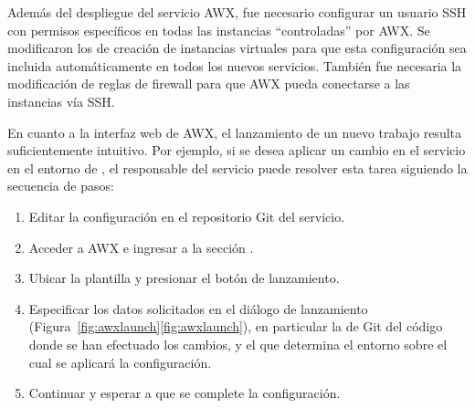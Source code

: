 Además del despliegue del servicio AWX, fue necesario configurar un
usuario SSH con permisos específicos en todas las instancias
``controladas'' por AWX. Se modificaron los  de
creación de instancias virtuales para que esta configuración sea
incluida automáticamente en todos los nuevos servicios. También fue
necesaria la modificación de reglas de firewall para que AWX pueda
conectarse a las instancias vía SSH.

En cuanto a la interfaz web de AWX, el lanzamiento de un nuevo trabajo
resulta suficientemente intuitivo. Por ejemplo, si se desea aplicar un
cambio en el servicio  en el entorno de
, el responsable del servicio puede resolver esta
tarea siguiendo la secuencia de pasos:

\begin{enumerate}
\item Editar la configuración en el repositorio Git del servicio.
\item Acceder a AWX e ingresar a la sección .
\item Ubicar la plantilla  y presionar el botón de
  lanzamiento.
\item Especificar los datos solicitados en el diálogo de lanzamiento
  (\iflatexml{}Figura~\ref{fig:awxlaunch}\else\autoref{fig:awxlaunch}\fi),
  en particular la  de Git del código donde se han efectuado
  los cambios, y el  que determina el entorno sobre el cual
  se aplicará la configuración.
\item Continuar y esperar a que se complete la configuración.
\end{enumerate}
%
